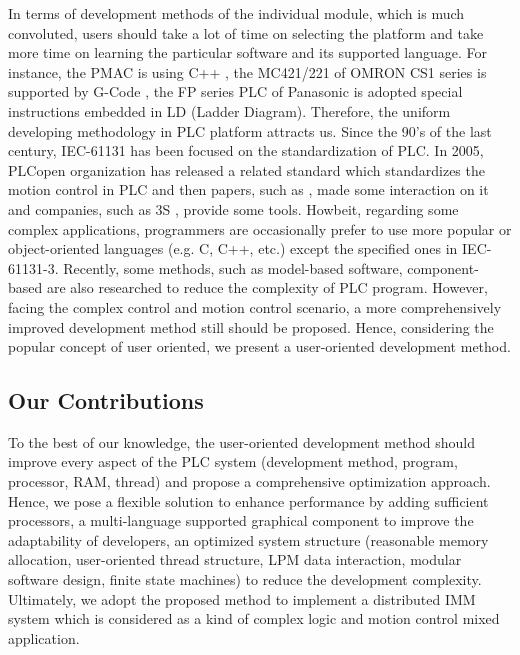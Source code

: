 \documentclass[journal,UTF8]{IEEEtran}
\begin{document}
In terms of development methods of the individual module, which is much convoluted, users should take a lot of time on selecting the platform and take more time on learning the particular software and its supported language. For instance, the PMAC is using C++ \cite{Peng2011Linear,Qian2014A}, the MC421/221 of OMRON CS1 series is supported by G-Code \cite{OMRON2006CS1W}, the FP series PLC of Panasonic is adopted special instructions embedded in LD (Ladder Diagram). Therefore, the uniform developing methodology in PLC platform attracts us. Since the 90's of the last century, IEC-61131 has been focused on the standardization of PLC\cite{IEC1993Programmable}. In 2005, PLCopen organization has released a related standard \cite{PLCopen2005Function} which standardizes the motion control in PLC and then papers, such as \cite{S2006Advanced}, made some interaction on it and companies, such as 3S \cite{3S2017Logic}, provide some tools. Howbeit, regarding some complex applications, programmers are occasionally prefer to use more popular or object-oriented languages (e.g. C, C++, etc.)\cite{Bonfe2001Object, Werner2009Object, Basile2013On} except the specified ones in IEC-61131-3. Recently, some methods, such as model-based software, component-based \cite{Bonf2013Design, Vyatkin2013Software} are also researched to reduce the complexity of PLC program. However, facing the complex control and motion control scenario, a more comprehensively improved development method still should be proposed. Hence, considering the popular concept of user oriented\cite{Verscheure2016User, Choi2017A}, we present a user-oriented development method.

\subsection{Our Contributions}
To the best of our knowledge, the user-oriented development method should improve every aspect of the PLC system (development method, program, processor, RAM, thread) and propose a comprehensive optimization approach. Hence, we pose a flexible solution to enhance performance by adding sufficient processors, a multi-language supported graphical component to improve the adaptability of developers, an optimized system structure (reasonable memory allocation, user-oriented thread structure, LPM data interaction, modular software design, finite state machines) to reduce the development complexity. Ultimately, we adopt the proposed method to implement a distributed IMM system which is considered as a kind of complex logic and motion control mixed application.
\end{document}
